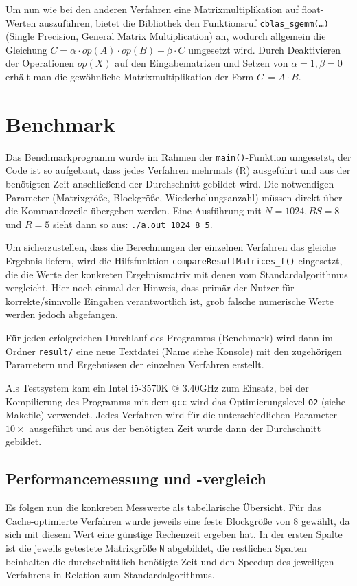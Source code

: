 \documentclass[a4paper,11pt]{scrartcl}
\begin{document}
Um nun wie bei den anderen Verfahren eine Matrixmultiplikation auf float-Werten auszuführen, 
bietet die Bibliothek den Funktionsruf \texttt{cblas\_sgemm(…)} (Single Precision, General Matrix Multiplication) an, wodurch allgemein die Gleichung  $C = \alpha \cdot op(A) \cdot op(B) + 
\beta \cdot C$ \cite{blasqr} umgesetzt wird. Durch Deaktivieren der Operationen $op(X)$ auf den 
Eingabematrizen und Setzen von $\alpha = 1, \beta = 0$ erhält man die gewöhnliche Matrixmultiplikation 
der Form $C\,= A \cdot B$.

\section{Benchmark}

Das Benchmarkprogramm wurde im Rahmen der \texttt{main()}-Funktion umgesetzt,
der Code ist so aufgebaut, dass jedes Verfahren mehrmals (R) ausgeführt 
und aus der benötigten Zeit anschließend der Durchschnitt gebildet wird. Die notwendigen Parameter
(Matrixgröße, Blockgröße, Wiederholungsanzahl) müssen direkt über die Kommandozeile übergeben werden.
Eine Ausführung mit $N = 1024, BS = 8$ und $R = 5$ sieht dann so aus: \texttt{./a.out 1024 8 5}.
\newline

Um sicherzustellen, dass die Berechnungen der einzelnen Verfahren das gleiche Ergebnis
liefern, wird die Hilfsfunktion \texttt{compareResultMatrices\_f()} eingesetzt, die
die Werte der konkreten Ergebnismatrix mit denen vom Standardalgorithmus vergleicht.
Hier noch einmal der Hinweis, dass primär der Nutzer für korrekte/sinnvolle Eingaben verantwortlich ist, 
grob falsche numerische Werte werden jedoch abgefangen.\newline

Für jeden erfolgreichen Durchlauf des Programms (Benchmark) wird dann im Ordner \texttt{result/} eine 
neue Textdatei (Name siehe Konsole) mit den zugehörigen Parametern und Ergebnissen der
einzelnen Verfahren erstellt. \newline

Als Testsystem kam ein Intel i5-3570K $@$ 3.40GHz zum Einsatz, bei der
Kompilierung des Programms mit dem \texttt{gcc} wird das Optimierungslevel \texttt{O2} (siehe Makefile)
verwendet. Jedes Verfahren wird für die unterschiedlichen
Parameter $10 \times$ ausgeführt und aus der benötigten Zeit wurde dann der
Durchschnitt gebildet.


\subsection{Performancemessung und -vergleich}\label{chp:Bench1}
Es folgen nun die konkreten Messwerte als tabellarische Übersicht.
Für das Cache-optimierte Verfahren wurde jeweils eine feste Blockgröße von $8$ gewählt,
da sich mit diesem Wert eine günstige Rechenzeit ergeben hat.
In der ersten Spalte ist die jeweils getestete Matrixgröße \texttt{N} abgebildet, 
die restlichen Spalten beinhalten die durchschnittlich benötigte Zeit und den Speedup des jeweiligen
Verfahrens in Relation zum Standardalgorithmus.
\end{document}
